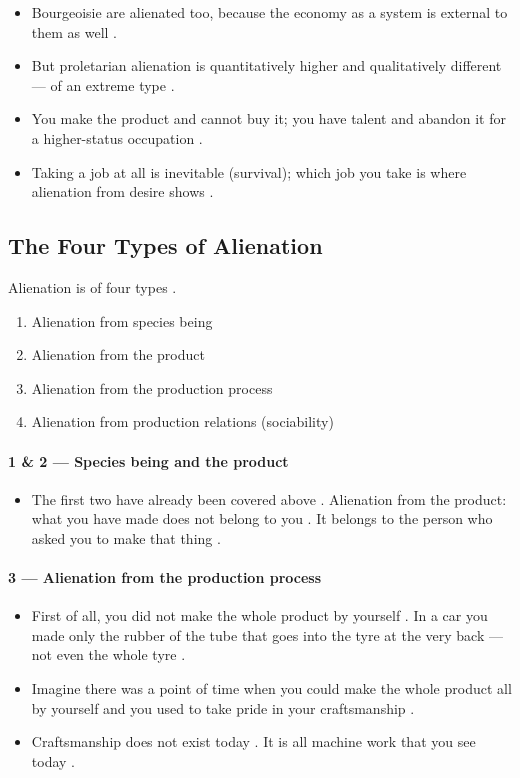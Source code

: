 \begin{QuickRevision}
\begin{itemize}
    \item Bourgeoisie are alienated too, because the economy as a system is external to them as well .
    \item But proletarian alienation is quantitatively higher and qualitatively different --- of an extreme type .
    \item You make the product and cannot buy it; you have talent and abandon it for a higher-status occupation .
    \item Taking a job at all is inevitable (survival); which job you take is where alienation from desire shows .
\end{itemize}
\end{QuickRevision}

\subsection{The Four Types of Alienation}
Alienation is of four types .
\begin{enumerate}
    \item Alienation from species being 
    \item Alienation from the product 
    \item Alienation from the production process 
    \item Alienation from production relations (sociability) 
\end{enumerate}

\paragraph{1 \& 2 --- Species being and the product}
\begin{itemize}
    \item The first two have already been covered above . Alienation from the product: what you have made does not belong to you . It belongs to the person who asked you to make that thing .
\end{itemize}

\paragraph{3 --- Alienation from the production process}
\begin{itemize}
    \item First of all, you did not make the whole product by yourself . In a car you made only the rubber of the tube that goes into the tyre at the very back --- not even the whole tyre .
    \item Imagine there was a point of time when you could make the whole product all by yourself and you used to take pride in your craftsmanship .
    \item Craftsmanship does not exist today . It is all machine work that you see today .
\end{itemize}

